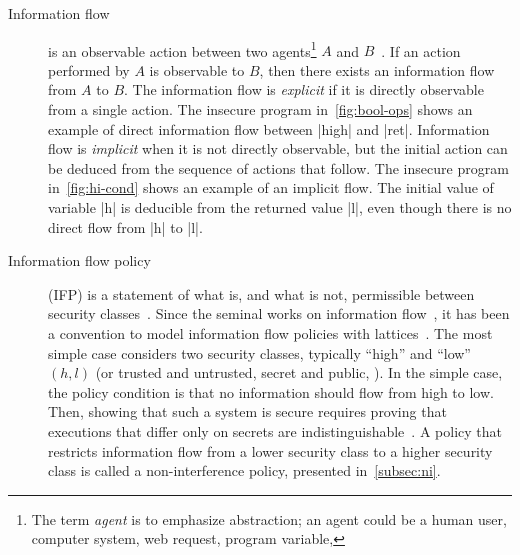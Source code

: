 \begin{description}

\item[Information flow]
is an observable action between two agents\footnote{
The term \emph{agent} is to emphasize abstraction; an agent could be a human user, computer system, web request, program variable, \etc
} \({A}\) and \({B}\)~\cite{eggert2014}.
If an action performed by \({A}\) is observable to \({B}\),
then there exists an information flow from \({A}\) to \({B}\).
The information flow is \emph{explicit} 
if it is directly observable from a single action.
The insecure program in~\autoref{fig:bool-ops} shows an example of direct information flow between \pr|high| and \pr|ret|.
Information flow is \emph{implicit} 
when it is not directly observable, but the initial action can be deduced from the sequence of actions that follow.
The insecure program in~\autoref{fig:hi-cond} shows an example of an implicit flow.
The initial value of variable \pr|h| is deducible from the returned value \pr|l|, even though there is no direct flow from \pr|h| to \pr|l|.

\item[Information flow policy] (IFP)
is a statement of what is, and what is not, permissible between security classes~\cite[p. 9]{bishop2003}.
Since the seminal works on information flow~\cite{biba1977,bell1976}, it has been a convention to model information flow policies with lattices~\cite{denning76}.
The most simple case considers two security classes, 
typically \enquote{high} and \enquote{low} \(({h}, {l})\) (or trusted and untrusted, secret and public, \etc).
In the simple case, the policy condition is that no information should flow from high to low.~\cite{bossi2005}
Then, showing that such a system is secure requires proving that executions that differ only on secrets are indistinguishable~\cite{piessens2024}.
A policy that restricts information flow from a lower security class to a higher security class is called a
{non-interference policy}, presented in~\autoref{subsec:ni}.


\end{description}
